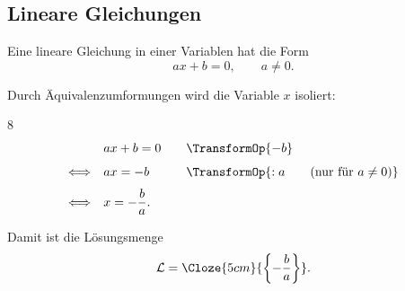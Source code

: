 \subsection{Lineare Gleichungen}
\label{subsec:fundamentals_linear_equations}

Eine lineare Gleichung in einer Variablen hat die Form
\[
  ax+b=0, \qquad a\neq 0.
\]
\noindent\begin{minipage}{\linewidth}
  Durch Äquivalenzumformungen wird die Variable $x$ isoliert:
  \begin{ClozeArea}[27]{8}
    \[
      \begin{array}{r@{\quad}l@{\qquad}l}
        & ax+b=0 & \TransformOp{-b} \\[0.7em]
        \Longleftrightarrow & ax=-b
          & \TransformOp{:a \qquad (\text{nur für }a\neq0)} \\[0.7em]
        \Longleftrightarrow & x=-\dfrac{b}{a}. &
      \end{array}
    \]
  \end{ClozeArea}
\end{minipage}
Damit ist die Lösungsmenge
\[
  \mathcal{L}=\Cloze{5cm}{\left\{-\frac{b}{a}\right\}}.
\]

